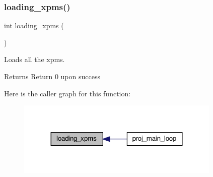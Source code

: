 \subsubsection{\texorpdfstring{loading\+\_\+xpms()}{loading\_xpms()}}
{\footnotesize\ttfamily int loading\+\_\+xpms (\begin{DoxyParamCaption}{ }\end{DoxyParamCaption})}



Loads all the xpms. 

\begin{DoxyReturn}{Returns}
Return 0 upon success 
\end{DoxyReturn}
Here is the caller graph for this function\+:
\nopagebreak
\begin{figure}[H]
\begin{center}
\leavevmode
\includegraphics[width=275pt]{group__loading__xpms_ga462cc2177dd9b043e5bd5689bbeaf868_icgraph}
\end{center}
\end{figure}
